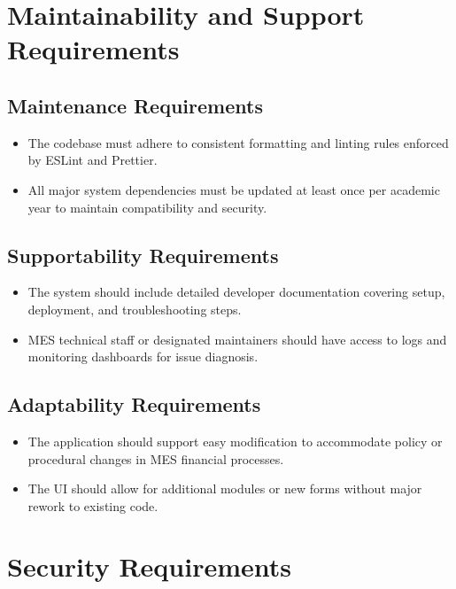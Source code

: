 \documentclass[12pt]{article}
\begin{document}
\section{Maintainability and Support Requirements}

\subsection{Maintenance Requirements}
\begin{itemize}
    \item The codebase must adhere to consistent formatting and linting rules enforced by ESLint and Prettier.
    \item All major system dependencies must be updated at least once per academic year to maintain compatibility and security.
\end{itemize}

\subsection{Supportability Requirements}
\begin{itemize}
    \item The system should include detailed developer documentation covering setup, deployment, and troubleshooting steps.
    \item MES technical staff or designated maintainers should have access to logs and monitoring dashboards for issue diagnosis.
\end{itemize}

\subsection{Adaptability Requirements}
\begin{itemize}
    \item The application should support easy modification to accommodate policy or procedural changes in MES financial processes.
    \item The UI should allow for additional modules or new forms without major rework to existing code.
\end{itemize}

\section{Security Requirements}
\end{document}
